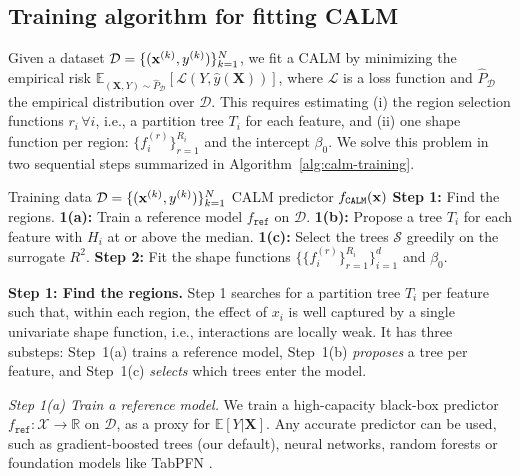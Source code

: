 \subsection{Training algorithm for fitting CALM}
\label{subsec:training}

Given a dataset \( \mathcal{D} = \{(\mathbf{x}^{(k)}, y^{(k)})\}_{k=1}^N \), we fit a CALM
by minimizing the empirical risk
\( \mathbb{E}_{(\mathbf{X}, Y) \sim \hat{P}_{\mathcal{D}}}\left [ \mathcal{L}(Y, \hat{y}(\mathbf{X})) \right ] \),
where $\mathcal{L}$ is a loss function
and
$\hat{P}_{\mathcal{D}}$ the empirical distribution over $\mathcal{D}$.
This requires estimating
(i) the region selection functions \( r_i \, \forall i \), i.e., a partition tree $T_i$ for each feature, and
(ii) one shape function per region: $\{f_i^{(r)}\}_{r=1}^{R_i}$ and the intercept $\beta_0$.
We solve this problem in two sequential steps summarized in Algorithm~\ref{alg:calm-training}.
\begin{algorithm}[tb]
\caption{Training a CALM model}
\label{alg:calm-training}
\begin{algorithmic}[1]
\renewcommand{\algorithmicensure}{\textbf{Output:}} %
\REQUIRE Training data \( \mathcal{D} = \{(\mathbf{x}^{(k)}, y^{(k)})\}_{k=1}^N \)
\ENSURE CALM predictor \( f_{\texttt{CALM}}(\mathbf{x}) \)
\STATE \textbf{Step 1:} Find the regions.
\STATE \quad \textbf{1(a):} Train a reference model \( f_{\texttt{ref}} \) on \( \mathcal{D} \).
\STATE \quad \textbf{1(b):} Propose a tree \( T_i \) for each feature with \( H_i \) at or above the median. 
\STATE \quad \textbf{1(c):} Select the trees \( \mathcal{S} \) greedily on the surrogate \( R^2 \). 
\STATE \textbf{Step 2:} Fit the shape functions \( \{ \{f_i^{(r)}\}_{r=1}^{R_i} \}_{i=1}^d \) and \( \beta_0 \). 
\end{algorithmic}
\end{algorithm}

\textbf{Step 1: Find the regions.}
Step 1 searches for a partition tree $T_i$ per feature such that, within each region, the effect of $x_i$ is well captured by a single univariate shape function, i.e., interactions are locally weak.
It has three substeps:
Step~1(a) trains a reference model,
Step~1(b) \emph{proposes} a tree per feature, and
Step~1(c) \emph{selects} which trees enter the model.

\textit{Step 1(a) Train a reference model.}
We train a high-capacity black-box predictor \( f_{\texttt{ref}} : \mathcal{X} \to \mathbb{R} \) on \( \mathcal{D}\), as a proxy for \( \mathbb{E}[Y | \mathbf{X} ] \).
Any accurate predictor can be used, such as gradient-boosted trees (our default), neural networks, random forests or foundation models like TabPFN \cite{hollmann2022tabpfn}.

